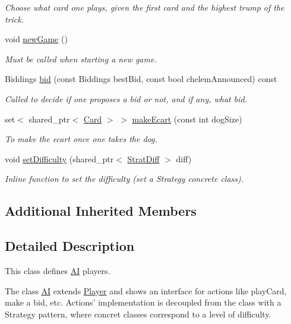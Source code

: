 \begin{DoxyCompactItemize}
\begin{DoxyCompactList}\small\item\em Choose what card one plays, given the first card and the highest trump of the trick. \end{DoxyCompactList}\item 
void \hyperlink{classAI_a6cda26d3bf7238b1a7ea3725bf4aabb7}{new\-Game} ()
\begin{DoxyCompactList}\small\item\em Must be called when starting a new game. \end{DoxyCompactList}\item 
Biddings \hyperlink{classAI_a9e2fd7ff440ada8339135c23b73e1a96}{bid} (const Biddings best\-Bid, const bool chelem\-Announced) const 
\begin{DoxyCompactList}\small\item\em Called to decide if one proposes a bid or not, and if any, what bid. \end{DoxyCompactList}\item 
set$<$ shared\-\_\-ptr$<$ \hyperlink{classCard}{Card} $>$ $>$ \hyperlink{classAI_ad12a3efd1da4acc6e1855bd7262779e3}{make\-Ecart} (const int dog\-Size)
\begin{DoxyCompactList}\small\item\em To make the ecart once one takes the dog. \end{DoxyCompactList}\item 
void \hyperlink{classAI_a19cae044bb7f221819f61b017b6a7ffe}{set\-Difficulty} (shared\-\_\-ptr$<$ \hyperlink{classStratDiff}{Strat\-Diff} $>$ diff)
\begin{DoxyCompactList}\small\item\em Inline function to set the difficulty (set a Strategy concrete class). \end{DoxyCompactList}\end{DoxyCompactItemize}
\subsection*{Additional Inherited Members}


\subsection{Detailed Description}
This class defines \hyperlink{classAI}{A\-I} players. 

The class \hyperlink{classAI}{A\-I} extends \hyperlink{classPlayer}{Player} and shows an interface for actions like play\-Card, make a bid, etc. Actions' implementation is decoupled from the class with a Strategy pattern, where concret classes correspond to a level of difficulty. 

